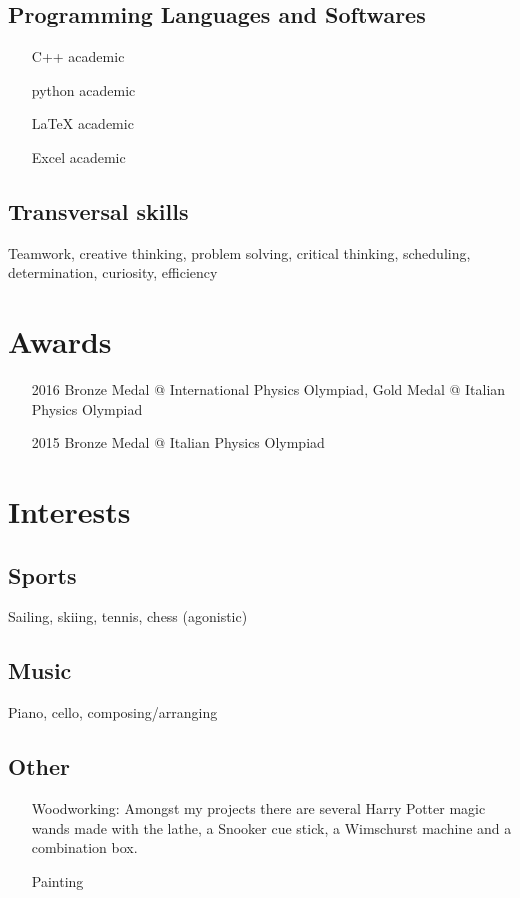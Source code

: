 \documentclass[11pt, a4 paper]{article}
\begin{document}
  \subsection*{Programming Languages and Softwares}
    \begin{multicols}{2}
      \begin{itemize}
        \item[C++] academic
        \item[python] academic
        \item[LaTeX] academic
        \item[Excel] academic
      \end{itemize}
    \end{multicols}


  \subsection*{Transversal skills}
    Teamwork, creative thinking, problem solving, critical thinking, scheduling, determination, curiosity, efficiency

\section*{Awards}
  \begin{itemize}
    \item[2016] Bronze Medal @ International Physics Olympiad, Gold Medal @ Italian Physics Olympiad
    \item[2015] Bronze Medal @ Italian Physics Olympiad
  \end{itemize}

\section*{Interests}
  \subsection*{Sports}
    Sailing, skiing, tennis, chess (agonistic)
  \subsection*{Music}
    Piano, cello, composing/arranging
  \subsection*{Other}
    \begin{itemize}
      \item[Woodworking:] Amongst my projects there are several Harry Potter magic wands made with the lathe, a Snooker cue stick, a Wimschurst machine and a combination box.
      \item[Painting]
    \end{itemize}
\end{document}
